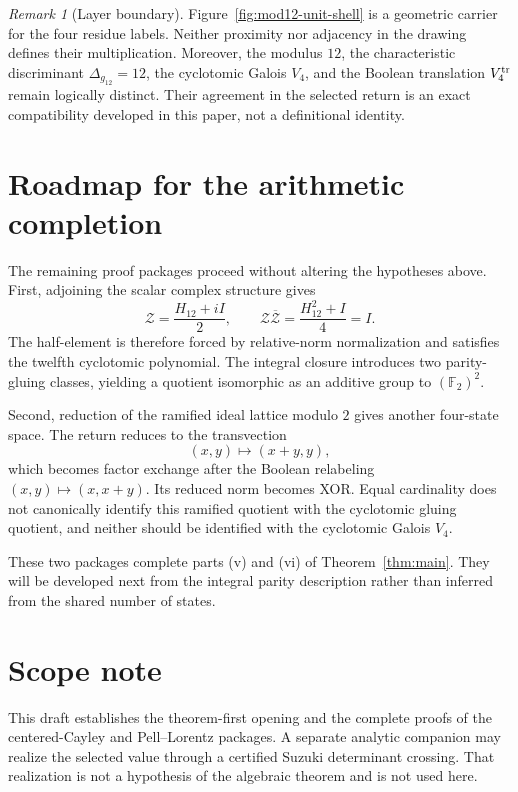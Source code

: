 \documentclass[11pt]{article}
\theoremstyle{definition}
\theoremstyle{remark}
\newtheorem{remark}[theorem]{Remark}
\newcommand{\F}{\mathbb F}
\begin{document}
\begin{remark}[Layer boundary]
Figure~\ref{fig:mod12-unit-shell} is a geometric carrier for the four residue
labels.  Neither proximity nor adjacency in the drawing defines their
multiplication.  Moreover, the modulus $12$, the characteristic discriminant
$\Delta_{g_{12}}=12$, the cyclotomic Galois $V_4$, and the Boolean translation
$V_4^{\rm tr}$ remain logically distinct.  Their agreement in the selected
return is an exact compatibility developed in this paper, not a definitional
identity.
\end{remark}

\section{Roadmap for the arithmetic completion}

The remaining proof packages proceed without altering the hypotheses above.
First, adjoining the scalar complex structure gives
\[
\mathcal Z=\frac{H_{12}+iI}{2},
\qquad
\mathcal Z\overline{\mathcal Z}
=\frac{H_{12}^2+I}{4}=I.
\]
The half-element is therefore forced by relative-norm normalization and
satisfies the twelfth cyclotomic polynomial.  The integral closure introduces
two parity-gluing classes, yielding a quotient isomorphic as an additive group
to $(\F_2)^2$.

Second, reduction of the ramified ideal lattice modulo $2$ gives another
four-state space.  The return reduces to the transvection
\[
(x,y)\longmapsto(x+y,y),
\]
which becomes factor exchange after the Boolean relabeling
$(x,y)\mapsto(x,x+y)$.  Its reduced norm becomes XOR.  Equal cardinality does
not canonically identify this ramified quotient with the cyclotomic gluing
quotient, and neither should be identified with the cyclotomic Galois $V_4$.

These two packages complete parts (v) and (vi) of
Theorem~\ref{thm:main}.  They will be developed next from the integral parity
description rather than inferred from the shared number of states.

\section*{Scope note}

This draft establishes the theorem-first opening and the complete proofs of
the centered-Cayley and Pell--Lorentz packages.  A separate analytic companion
may realize the selected value through a certified Suzuki determinant
crossing.  That realization is not a hypothesis of the algebraic theorem and
is not used here.
\end{document}
